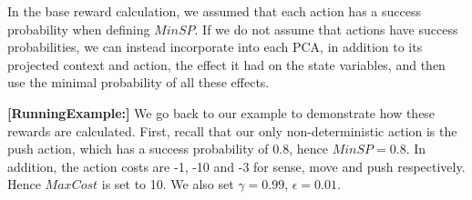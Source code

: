 \documentclass[letterpaper]{article} %
\newcommand{\eliran}[1]{\textbf{[\color{red}ELIRAN:#1]}}
\newcommand{\guy}[1]{\textbf{[\color{orange}GUY:#1]}}
\newcommand{\RE}[1]{\textbf{[\color{purple}RunningExample:#1]}}
\begin{document}

In the base reward calculation, we assumed that each action has a success probability when defining $MinSP$. If we do not assume that actions have success probabilities, we can instead incorporate into each PCA, in addition to its projected context and action, the effect it had on the state variables, and then use the minimal probability of all these effects.

\RE{}
We go back to our example to demonstrate how these rewards are calculated.
First, recall that our only non-deterministic action is the push action, which has a success probability of 0.8, hence $MinSP=0.8$. In addition, the action costs are -1, -10 and -3 for sense, move and push respectively. Hence $MaxCost$ is set to 10. We also set $\gamma=0.99$, $\epsilon=0.01$.
\end{document}
